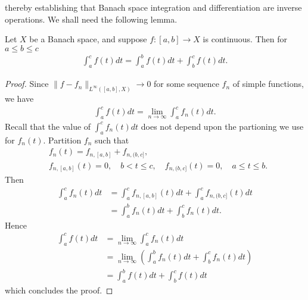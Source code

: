 thereby establishing that Banach space integration and
differentiation are inverse operations. We shall need the following lemma.
%
%
%
%
%
%
%
%
%
%
\begin{lemma}
  Let $X$ be a Banach space, and suppose $f: [a,b] \to X$ is continuous. Then for
  $a \le b \le c$ 
%
%
\begin{equation*}
\begin{split}
  \int_{a}^{c} f(t) dt = \int_{a}^{b} f(t) dt + \int_{b}^{c} f(t) dt.
\end{split}
\end{equation*}
%
%
\label{lem:int-splitting}
\end{lemma}
%
%
%
%
\begin{proof}
  Since $\| f - f_{n} \|_{L^{\infty}\left( [a,b], X \right)} \to 0$ for some sequence
  $f_{n}$ of simple functions, we have
  \begin{equation*}
  \begin{split}
    \int_{a}^{c} f(t) dt = \lim_{n \to \infty} \int_{a}^{c} f_{n}(t) dt.
  \end{split}
  \end{equation*}
  Recall that the value of $\int_{a}^{c}f_{n}(t) dt$ does not depend upon the
  partioning we use for $f_{n}(t)$. Partition $f_{n}$ such that
  \begin{equation}
    \begin{split}
  & f_{n}(t) = f_{n, [a,b]} + f_{n, (b, c]},  
    \\
    & f_{n, [a,b]}(t) =0, \quad b< t \le c, \quad f_{n, (b, c]}(t) = 0, \quad
    a \le t \le b.
\end{split}
\end{equation}
Then
  \begin{equation*}
  \begin{split}
    \int_{a}^{c} f_{n}(t) dt & = \int_{a}^{c} f_{n, [a,b]}(t)dt  +
    \int_{a}^{c} f_{n, (b,c]}(t)dt 
    \\
    & = \int_{a}^{b} f_{n}(t)dt  +
    \int_{b}^{c} f_{n}(t)dt.
  \end{split}
  \end{equation*}
Hence 
 \begin{equation*}
 \begin{split}
   \int_{a}^{c} f(t) dt 
   & = \lim_{n \to \infty} \int_{a}^{c} f_{n}(t) dt
   \\
   &= \lim_{n \to \infty} \left ( \int_{a}^{b} f_{n}(t)dt  +
    \int_{b}^{c} f_{n}(t)dt \right )
    \\
    & =\int_{a}^{b} f(t) dt + \int_{b}^{c} f(t) dt
 \end{split}
 \end{equation*}
which concludes the proof.
\end{proof}
